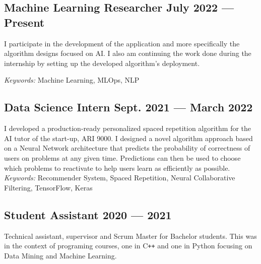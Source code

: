 \subsection{Machine Learning Researcher \hfill July 2022 --- Present}
\vspace{0.7\baselineskip}

I participate in the development of the application and more specifically the algorithm designs focused on AI. I also
am continuing the work done during the internship by setting up the developed algorithm's deployment.

\textit{Keywords:} Machine Learning, MLOps, NLP
\vspace{0.35\baselineskip}

\subsection{Data Science Intern \hfill Sept. 2021 --- March 2022}
\vspace{0.7\baselineskip}

I developed a production-ready personalized spaced repetition algorithm for the AI tutor of the start-up, ARI 9000. I
designed a novel algorithm approach based on a Neural Network architecture that predicts the probability of
correctness of users on problems at any given time. Predictions can then be used to choose which problems to
reactivate to help users learn as efficiently as possible.\\

\textit{Keywords:} Recommender System, Spaced Repetition, Neural Collaborative Filtering, TensorFlow, Keras
\vspace{0.35\baselineskip}

\subsection{Student Assistant \hfill 2020 --- 2021}
\vspace{0.7\baselineskip}

Technical assistant, supervisor and Scrum Master for Bachelor students. This was in the context of programing courses,
one in C\texttt{++} and one in Python focusing on Data Mining and Machine Learning.

